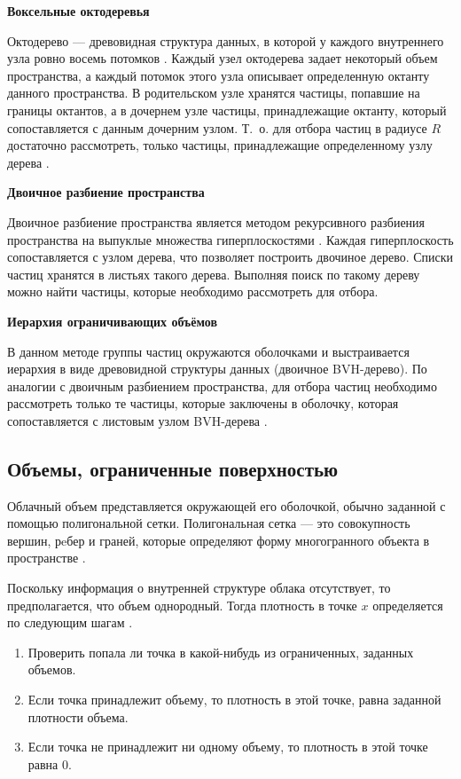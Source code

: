 \textbf{Воксельные октодеревья}

Октодерево --- древовидная структура данных, в которой у каждого внутреннего узла ровно восемь потомков \cite{octree}.
Каждый узел октодерева задает некоторый объем пространства, а каждый потомок этого узла описывает определенную октанту данного пространства. 
В родительском узле хранятся частицы, попавшие на границы октантов, а в дочернем узле частицы, принадлежащие октанту, который сопоставляется с данным дочерним узлом. Т.~о. для отбора частиц в радиусе $R$ достаточно рассмотреть, только частицы, принадлежащие определенному узлу дерева \cite{clouds}. 

\textbf{Двоичное разбиение пространства}

Двоичное разбиение пространства является методом рекурсивного разбиения пространства на выпуклые множества гиперплоскостями \cite{neighbours}. Каждая гиперплоскость сопоставляется с узлом дерева, что позволяет построить двочиное дерево. Списки частиц хранятся в листьях такого дерева. Выполняя поиск по такому дереву можно найти частицы, которые необходимо рассмотреть для отбора.

\textbf{Иерархия ограничивающих объёмов}

В данном методе группы частиц окружаются оболочками и выстраивается иерархия в виде древовидной структуры данных (двоичное BVH-дерево). По аналогии с двоичным разбиением пространства, для отбора частиц необходимо рассмотреть только те частицы, которые заключены в оболочку, которая сопоставляется с листовым узлом BVH-дерева \cite{clouds}.


\subsection{Объемы, ограниченные поверхностью} 
Облачный объем представляется окружающей его оболочкой, обычно заданной с помощью полигональной сетки. Полигональная сетка --- это совокупность вершин, рeбер и граней, которые определяют форму многогранного объекта в пространстве \cite{mesh}.

Поскольку информация о внутренней структуре облака отсутствует, то предполагается, что объем однородный. Тогда плотность в точке $x$ определяется по следующим шагам \cite{clouds}. 
\begin{enumerate}
	\item Проверить попала ли точка в какой-нибудь из ограниченных, заданных объемов.
	\item Если точка принадлежит объему, то плотность в этой точке, равна заданной плотности объема.
	\item Если точка не принадлежит ни одному объему, то плотность в этой точке равна 0.
\end{enumerate}

